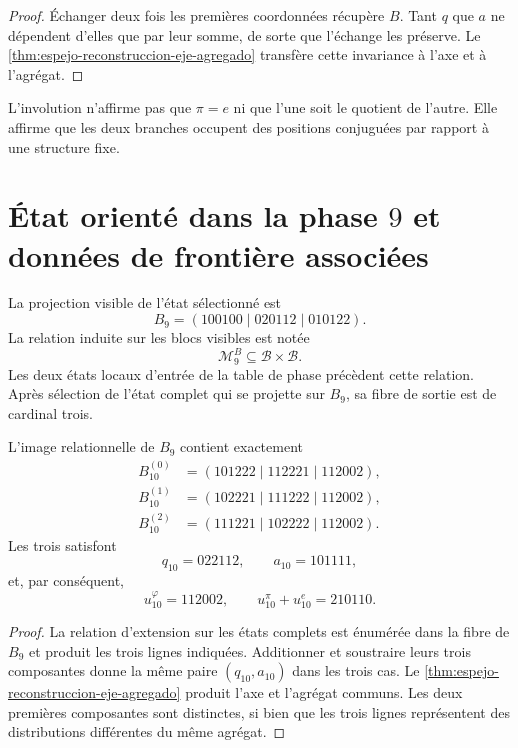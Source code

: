\begin{proof}
Échanger deux fois les premières coordonnées récupère \(B\). Tant
\(q\) que \(a\) ne dépendent d'elles que par leur somme, de sorte que
l'échange les préserve. Le \cref{thm:espejo-reconstruccion-eje-agregado}
transfère cette invariance à l'axe et à l'agrégat.
\end{proof}

L'involution n'affirme pas que \(\pi=e\) ni que l'une soit le quotient de l'autre.
Elle affirme que les deux branches occupent des positions conjuguées par rapport à une
structure fixe.

\section{État orienté dans la phase \(9\) et données de frontière associées}

La projection visible de l'état sélectionné est
\[
 B_9=(100100\mid020112\mid010122).
\]
La relation induite sur les blocs visibles est notée
\[
 \mathcal M_9^B\subseteq\mathcal B\times\mathcal B.
\]
Les deux états locaux d'entrée de la table de phase précèdent cette
relation. Après sélection de l'état complet qui se projette sur \(B_9\), sa
fibre de sortie est de cardinal trois.

\begin{theorem}
\label{thm:espejo-tres-extensiones}
L'image relationnelle de \(B_9\) contient exactement
\begin{align*}
B_{10}^{(0)}&=(101222\mid112221\mid112002),\\
B_{10}^{(1)}&=(102221\mid111222\mid112002),\\
B_{10}^{(2)}&=(111221\mid102222\mid112002).
\end{align*}
Les trois satisfont
\[
 q_{10}=022112,
 \qquad
 a_{10}=101111,
\]
et, par conséquent,
\[
 u_{10}^\varphi=112002,
 \qquad
 u_{10}^\pi+u_{10}^e=210110.
\]
\end{theorem}

\begin{proof}
La relation d'extension sur les états complets est énumérée dans la fibre de
\(B_9\) et produit les trois lignes indiquées. Additionner et soustraire leurs trois
composantes donne la même paire \((q_{10},a_{10})\) dans les trois cas. Le
\cref{thm:espejo-reconstruccion-eje-agregado} produit l'axe et l'agrégat
communs. Les deux premières composantes sont distinctes, si bien que les trois
lignes représentent des distributions différentes du même agrégat.
\end{proof}

